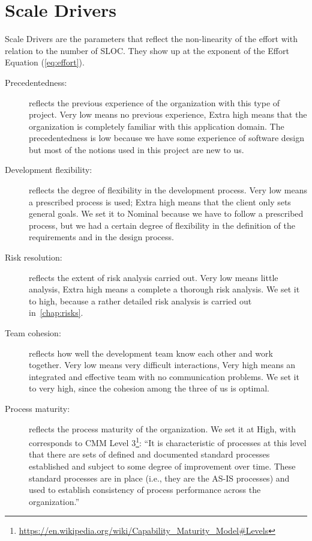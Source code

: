 \section{Scale Drivers}

Scale Drivers are the parameters that reflect the non-linearity of the effort with relation to the number of SLOC. They show up at the exponent of the Effort Equation (\autoref{eq:effort}).

\begin{description}

    \item[Precedentedness:] reflects the previous experience of the organization with this type of project. Very low means no previous experience, Extra high means that the organization is completely familiar with this application domain.
    The precedentedness is low because we have some experience of software design but most of the notions used in this project are new to us.

    \item[Development flexibility:] reflects the degree of flexibility in the development process. Very low means a prescribed process is used; Extra high means that the client only sets general goals. We set it to Nominal because we have to follow a prescribed process, but we had a certain degree of flexibility in the definition of the requirements and in the design process.

    \item[Risk resolution:] reflects the extent of risk analysis carried out. Very low means little analysis, Extra high means a complete a thorough risk analysis. We set it to high, because a rather detailed risk analysis is carried out in~\autoref{chap:risks}.

    \item[Team cohesion:] reflects how well the development team know each other and work together. Very low means very difficult interactions, Very high means an integrated and effective team with no communication problems. We set it to very high, since the cohesion among the three of us is optimal.

    \item[Process maturity:] reflects the process maturity of the organization. We set it at High, with corresponds to CMM Level 3\footnote{\url{https://en.wikipedia.org/wiki/Capability_Maturity_Model\#Levels}}: ``It is characteristic of processes at this level that there are sets of defined and documented standard processes established and subject to some degree of improvement over time. These standard processes are in place (i.e., they are the AS-IS processes) and used to establish consistency of process performance across the organization.''

\end{description}

